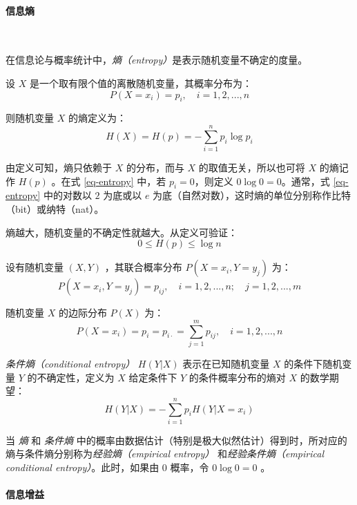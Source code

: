 \documentclass{ctexart}
\numberwithin{equation}{section}
\begin{document}
\paragraph{信息熵}~{}

在信息论与概率统计中，\emph{熵（entropy）}是表示随机变量不确定的度量。

设 $X$ 是一个取有限个值的离散随机变量，其概率分布为：
\begin{equation}
	P(X=x_i)=p_i, \quad i=1,2,...,n
\end{equation}

则随机变量 $X$ 的熵定义为：
\begin{equation}
	H(X) = H(p) = -\sum_{i=1}^{n} p_i \log p_i \label{eq-entropy}
\end{equation}

由定义可知，熵只依赖于 $X$ 的分布，而与 $X$ 的取值无关，所以也可将 $X$ 的熵记作 $H(p)$ 。在式 \ref{eq-entropy} 中，若 $p_i=0$，则定义 $0 \log 0 = 0$。通常，式 \ref{eq-entropy} 中的对数以 $2$ 为底或以 $e$ 为底（自然对数），这时熵的单位分别称作比特（bit）或纳特（nat）。

熵越大，随机变量的不确定性就越大。从定义可验证：
\begin{equation}
	0 \leq H(p) \leq \log n
\end{equation}

设有随机变量 $(X,Y)$ ，其联合概率分布 $P(X=x_i,Y=y_j)$ 为：
\begin{equation}
	P(X=x_i,Y=y_j) = p_{ij}, \quad i=1,2,...,n; \quad j=1,2,...,m
\end{equation}

随机变量 $X$ 的边际分布 $P(X)$ 为：
\begin{equation}
	P(X=x_i) = p_i = p_{i \cdot} = \sum_{j=1}^{m} p_{ij}, \quad i=1,2,...,n
\end{equation}

\emph{条件熵（conditional entropy）} $H(Y|X)$ 表示在已知随机变量 $X$ 的条件下随机变量 $Y$ 的不确定性，定义为 $X$ 给定条件下 $Y$ 的条件概率分布的熵对 $X$ 的数学期望：
\begin{equation}
	H(Y|X) = -\sum_{i=1}^{n} p_i H(Y|X=x_i)
\end{equation}

当 \emph{熵} 和 \emph{条件熵} 中的概率由数据估计（特别是极大似然估计）得到时，所对应的熵与条件熵分别称为\emph{经验熵（empirical entropy） }和\emph{经验条件熵（empirical conditional entropy）}。此时，如果由 $0$ 概率，令 $ 0 \log 0 = 0 $ 。


\paragraph{信息增益}~{}
\end{document}
